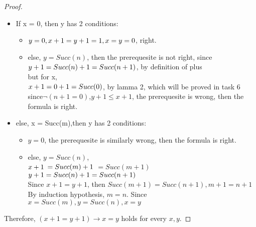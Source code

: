\documentclass[11pt,a4paper]{article}
\begin{document}
\begin{proof}
    \begin{itemize}
        \item If x = 0, then y has 2 conditions:
            \begin{itemize}
                \item $y = 0\\, x + 1 = y + 1 = 1\\, x = y = 0$, right.
                \item else, $y = Succ(n)$, then the prerequesite is not right, since\\
                $y + 1\\ 
                = Succ(n) + 1\\
                = Succ(n + 1)$, by definition of plus\\
                but for x,\\
                $x + 1\\
                = 0 + 1\\
                = Succ(0)$, by lamma 2, which will be proved in task 6\\
                
                since$\lnot (n + 1 = 0)$,$y + 1 \leq x + 1$, the prerequesite is wrong, then the formula is right.
            \end{itemize}{}
                \item else, x = Succ(m),then y has 2 conditions:
                    \begin{itemize}
                    \item $y = 0$, the prerequesite is similarly wrong, then the formula is right.
                    \item else, $y = Succ(n)$, \\
                    $x + 1  \\$
                    $=Succ(m) + 1\\$
                    $=Succ(m + 1)$\\
                    $y + 1 \\
                    = Succ(n) + 1\\
                    = Succ(n + 1)$\\
                    Since $x + 1 = y + 1$, then $Succ(m + 1) = Succ(n + 1), m + 1 = n + 1$\\
                    By induction hypothesis, $m = n$. Since$x = Succ(m), y = Succ(n), x = y$
            \end{itemize}{}
    \end{itemize}
    Therefore, $(x + 1 = y + 1) \to x = y$ holds for every $x, y$.

\end{proof}
\end{document}
